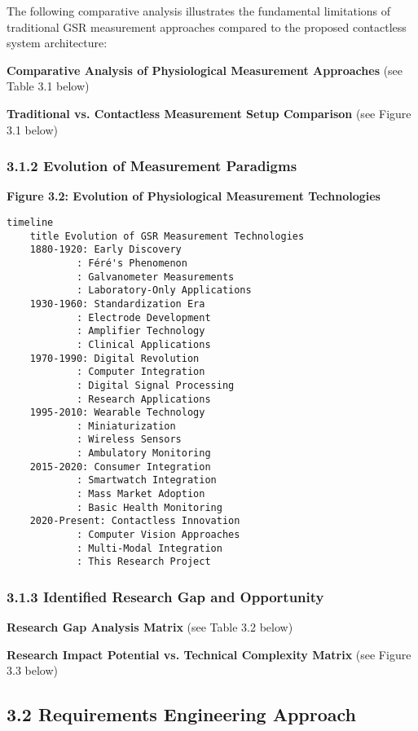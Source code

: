 \documentclass[12pt,a4paper]{article}
\begin{document}
The following comparative analysis illustrates the fundamental limitations of traditional GSR measurement approaches
compared to the proposed contactless system architecture:

\textbf{Comparative Analysis of Physiological Measurement Approaches} (see Table 3.1 below)

\textbf{Traditional vs. Contactless Measurement Setup Comparison} (see Figure 3.1 below)

\subsubsection{3.1.2 Evolution of Measurement Paradigms}

\textbf{Figure 3.2: Evolution of Physiological Measurement Technologies}

\begin{verbatim}
timeline
    title Evolution of GSR Measurement Technologies
    1880-1920: Early Discovery
            : Féré's Phenomenon
            : Galvanometer Measurements
            : Laboratory-Only Applications
    1930-1960: Standardization Era
            : Electrode Development
            : Amplifier Technology
            : Clinical Applications
    1970-1990: Digital Revolution
            : Computer Integration
            : Digital Signal Processing
            : Research Applications
    1995-2010: Wearable Technology
            : Miniaturization
            : Wireless Sensors
            : Ambulatory Monitoring
    2015-2020: Consumer Integration
            : Smartwatch Integration
            : Mass Market Adoption
            : Basic Health Monitoring
    2020-Present: Contactless Innovation
            : Computer Vision Approaches
            : Multi-Modal Integration
            : This Research Project
\end{verbatim}

\subsubsection{3.1.3 Identified Research Gap and Opportunity}

\textbf{Research Gap Analysis Matrix} (see Table 3.2 below)

\textbf{Research Impact Potential vs. Technical Complexity Matrix} (see Figure 3.3 below)

\subsection{3.2 Requirements Engineering Approach}
\end{document}
